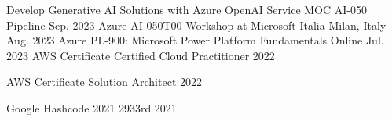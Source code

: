 
\begin{cvhonors}

  \cvhonor
    {Develop Generative AI Solutions with Azure OpenAI Service MOC AI-050} %
    {Pipeline} %
    {} %
    {Sep. 2023} %
  \cvhonor
    {Azure AI-050T00} %
    {Workshop at Microsoft Italia} %
    {Milan, Italy} %
    {Aug. 2023} %
  \cvhonor
    {Azure PL-900: Microsoft Power Platform Fundamentals} %
    {} %
    {Online} %
    {Jul. 2023} %
  \cvhonor
    {AWS Certificate} %
    {Certified Cloud Practitioner} %
    {} %
    {2022} %

  \cvhonor
    {AWS Certificate} %
    {Solution Architect} %
    {} %
    {2022} %

  \cvhonor
    {Google Hashcode 2021} %
    {2933rd} %
    {} %
    {2021} %


\end{cvhonors}


